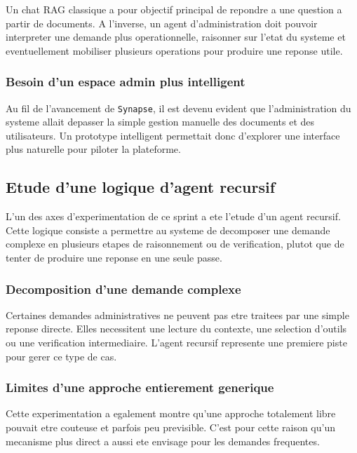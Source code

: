 Un chat RAG classique a pour objectif principal de repondre a une question a partir de documents. A l'inverse, un agent d'administration doit pouvoir interpreter une demande plus operationnelle, raisonner sur l'etat du systeme et eventuellement mobiliser plusieurs operations pour produire une reponse utile.

\subsubsection{Besoin d'un espace admin plus intelligent}

Au fil de l'avancement de \texttt{Synapse}, il est devenu evident que l'administration du systeme allait depasser la simple gestion manuelle des documents et des utilisateurs. Un prototype intelligent permettait donc d'explorer une interface plus naturelle pour piloter la plateforme.

\subsection{Etude d'une logique d'agent recursif}

L'un des axes d'experimentation de ce sprint a ete l'etude d'un agent recursif. Cette logique consiste a permettre au systeme de decomposer une demande complexe en plusieurs etapes de raisonnement ou de verification, plutot que de tenter de produire une reponse en une seule passe.

\subsubsection{Decomposition d'une demande complexe}

Certaines demandes administratives ne peuvent pas etre traitees par une simple reponse directe. Elles necessitent une lecture du contexte, une selection d'outils ou une verification intermediaire. L'agent recursif represente une premiere piste pour gerer ce type de cas.

\subsubsection{Limites d'une approche entierement generique}

Cette experimentation a egalement montre qu'une approche totalement libre pouvait etre couteuse et parfois peu previsible. C'est pour cette raison qu'un mecanisme plus direct a aussi ete envisage pour les demandes frequentes.

